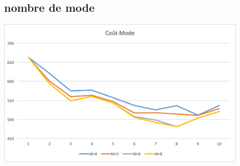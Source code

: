 \documentclass[12pt,a4paper]{article}
\begin{document}
\subsection{nombre de mode}
\begin{minipage}[r]{.99\linewidth}
	\center\includegraphics[width=12cm]{img/change/mode-cout.png}
	\begin{center}
	\end{center}
\end{minipage}
\end{document}
